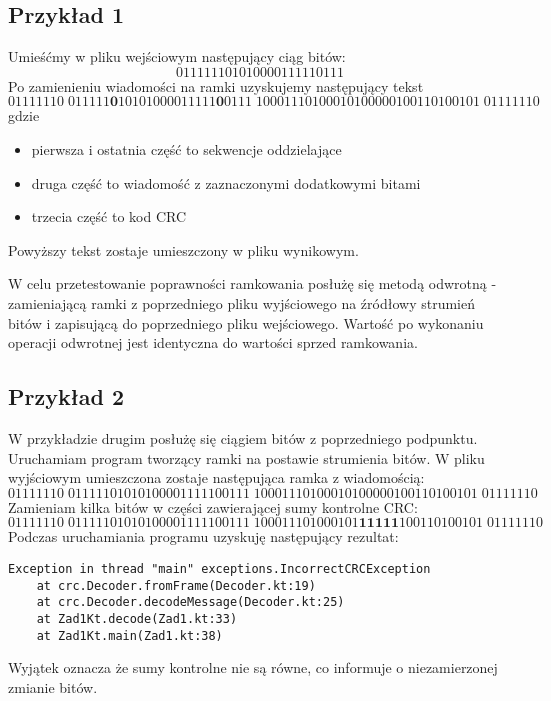 \documentclass[titlepage]{article}
\begin{document}
\subsection{Przykład 1}
Umieśćmy w pliku wejściowym następujący ciąg bitów:
\begin{equation*}
011111101010000111110111
\end{equation*}
Po zamienieniu wiadomości na ramki uzyskujemy następujący tekst
\begin{equation*}
01111110\;011111\textbf{0}10101000011111\textbf{0}0111\;10001110100010100000100110100101\;01111110
\end{equation*}
gdzie 
\begin{itemize}
\itemsep0em
\item pierwsza i ostatnia część to sekwencje oddzielające
\item druga część to wiadomość z zaznaczonymi dodatkowymi bitami
\item trzecia część to kod CRC
\end{itemize}
Powyższy tekst zostaje umieszczony w pliku wynikowym.

W celu przetestowanie poprawności ramkowania posłużę się metodą odwrotną - zamieniającą ramki z poprzedniego pliku wyjściowego na źródłowy strumień bitów i zapisującą do poprzedniego pliku wejściowego. Wartość po wykonaniu operacji odwrotnej jest identyczna do wartości sprzed ramkowania.

\subsection{Przykład 2}
W przykładzie drugim posłużę się ciągiem bitów z poprzedniego podpunktu. Uruchamiam program tworzący ramki na postawie strumienia bitów. W pliku wyjściowym umieszczona zostaje następująca ramka z wiadomością:
\begin{equation*}
01111110\;01111101010100001111100111\;10001110100010100000100110100101\;01111110
\end{equation*}
Zamieniam kilka bitów w części zawierającej sumy kontrolne CRC:
\begin{equation*}
01111110\;01111101010100001111100111\;100011101000101\textbf{11111}100110100101\;01111110
\end{equation*}
Podczas uruchamiania programu uzyskuję następujący rezultat:
\begin{lstlisting}
Exception in thread "main" exceptions.IncorrectCRCException
	at crc.Decoder.fromFrame(Decoder.kt:19)
	at crc.Decoder.decodeMessage(Decoder.kt:25)
	at Zad1Kt.decode(Zad1.kt:33)
	at Zad1Kt.main(Zad1.kt:38)
\end{lstlisting}
Wyjątek oznacza że sumy kontrolne nie są równe, co informuje o niezamierzonej zmianie bitów.
\end{document}

